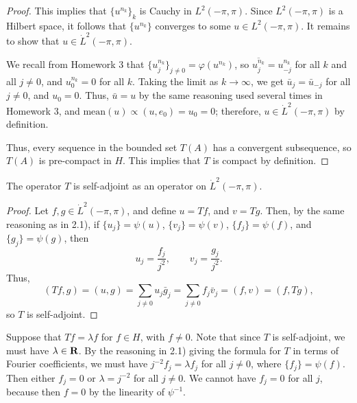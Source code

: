 \documentclass{homework}
\begin{document}
\begin{arabicparts}
\begin{proof}
			This implies that $\{u^{n_k}\}_k$ is Cauchy in $L^2(-\pi,\pi)$. Since $L^2(-\pi,\pi)$ is a Hilbert space, it follows that $\{u^{n_k}\}$ converges to some $u \in L^2(-\pi,\pi)$. It remains to show that $u \in \dot{L}^2(-\pi,\pi)$.
			
			We recall from Homework 3 that $\{u^{n_k}_j\}_{j\ne0} = \varphi(u^{n_k})$, so $\overline{u^{n_k}_j} = u^{n_k}_{-j}$ for all $k$ and all $j\ne0$, and $u^{n_k}_0 = 0$ for all $k$. Taking the limit as $k\to\infty$, we get $\bar{u}_j = \bar{u}_{-j}$ for all $j \ne 0$, and $u_0 = 0$. Thus, $\bar{u} = u$ by the same reasoning used several times in Homework 3, and $\mathrm{mean}(u)\propto (u,e_0)=u_0=0$; therefore, $u \in \dot{L}^2(-\pi,\pi)$ by definition.
			
			Thus, every sequence in the bounded set $T(A)$ has a convergent subsequence, so $T(A)$ is pre-compact in $H$. This implies that $T$ is compact by definition.
		\end{proof}
		
		\questionpart The operator $T$ is self-adjoint as an operator on $\dot{L}^2(-\pi,\pi)$.
		\begin{proof}
			Let $f,g \in \dot{L}^2(-\pi,\pi)$, and define $u = Tf$, and $v = Tg$. Then, by the same reasoning as in 2.1), if $\{u_j\} = \psi(u)$, $\{v_j\} = \psi(v)$, $\{f_j\} = \psi(f)$, and $\{g_j\} = \psi(g)$, then
			\begin{equation}
				u_j = \frac{f_j}{j^2}, \qquad v_j = \frac{g_j}{j^2}.
			\end{equation}
			Thus,
			\begin{equation}
				(Tf, g) = (u, g) = \sum_{j\ne0}u_j\bar{g}_j = \sum_{j\ne0}f_j\bar{v}_j = (f,v) = (f,Tg),
			\end{equation}
			so $T$ is self-adjoint.
		\end{proof}
		
		\questionpart
		Suppose that $Tf = \lambda f$ for $f \in H$, with $f\ne0$. Note that since $T$ is self-adjoint, we must have $\lambda \in \textnormal{\bf R}$. By the reasoning in 2.1) giving the formula for $T$ in terms of Fourier coefficients, we must have $j^{-2}f_j = \lambda f_j$ for all $j\ne0$, where $\{f_j\} = \psi(f)$. Then either $f_j = 0$ or $\lambda = j^{-2}$ for all $j \ne 0$. We cannot have $f_j = 0$ for all $j$, because then $f = 0$ by the linearity of $\psi^{-1}$.
		

\end{arabicparts}
\end{document}
